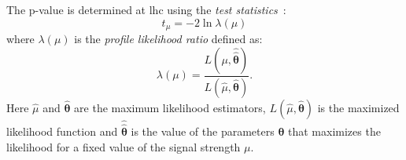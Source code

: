 The p-value is determined at \gls{lhc} using the \emph{test
  statistics}~\cite{StatProcedure}:
\begin{equation}
  \label{eq:86}
  t_\mu = - 2 \ln \lambda(\mu)
\end{equation}
where $\lambda(\mu)$ is the \emph{profile likelihood ratio} defined as:
\begin{equation}
  \label{eq:87}
  \lambda(\mu) = \frac{L(\mu, \hat{\hat{\boldsymbol{\theta}}})}{L(\hat{\mu},
    \hat{\boldsymbol{\theta}})}.
\end{equation}
Here $\hat{\mu}$ and $\hat{\boldsymbol{\theta}}$ are the maximum likelihood
estimators, $L(\hat{\mu}, \hat{\boldsymbol{\theta}})$ is the maximized likelihood
function and $\hat{\hat{\boldsymbol{\theta}}}$ is the value of the parameters
$\boldsymbol{\theta}$ that maximizes the likelihood for a fixed value of the
signal strength $\mu$.
